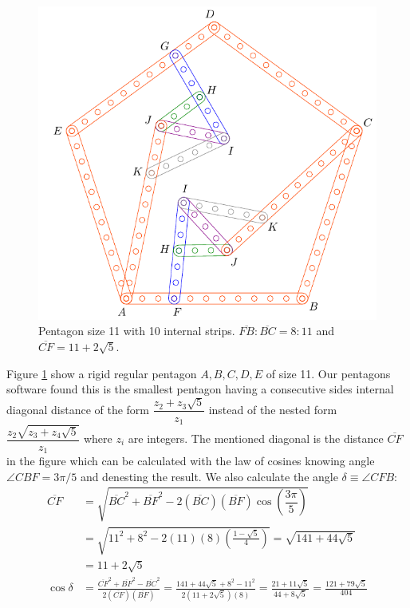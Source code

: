 \documentclass[11pt]{article}
\begin{document}
\begin{figure}[h]
 \centering
 \includegraphics[scale=1]{11/penta11a}
 \caption{Pentagon size 11 with 10 internal strips. $\overline{FB}:\overline{BC} = 8:11$ and $\overline{CF} = 11 + 2\sqrt5$.}
 \label{fig:penta11a}
\end{figure}

Figure \ref{fig:penta11a} show a rigid regular pentagon $A,B,C,D,E$ of size 11. Our pentagons software found this is the smallest pentagon having a consecutive sides internal diagonal distance of the form $\dfrac{z_2 + z_3\sqrt5}{z_1}$ instead of the nested form $\dfrac{z_2\sqrt{z_3+z_4\sqrt5}}{z_1}$ where $z_i$ are integers. The mentioned diagonal is the distance $\overline{CF}$ in the figure which can be calculated with the law of cosines knowing angle $\angle{CBF} = 3\pi/5$ and denesting the result. We also calculate the angle $\delta \equiv \angle{CFB}$:
\begin{align}
\overline{CF} &= \sqrt{\overline{BC}^2 + \overline{BF}^2 
 - 2(\overline{BC})(\overline{BF})\cos\left(\dfrac{3\pi}5\right)} \nonumber\\
 &= \sqrt{11^2 + 8^2 - 2(11)(8)\left(\frac{1-\sqrt5}4\right)} = \sqrt{141 + 44\sqrt5} \nonumber\\
 &= 11 + 2\sqrt5 \\
%
\cos\delta &= \frac{\overline{CF}^2 + \overline{BF}^2 - \overline{BC}^2}
 {2(\overline{CF})(\overline{BF})}%
 = \frac{141+44\sqrt5 + 8^2 - 11^2}{2(11+2\sqrt5)(8)}
  = \frac{21+11\sqrt5}{44+8\sqrt5} = \frac{121+79\sqrt5}{404}
\end{align}
\end{document}
